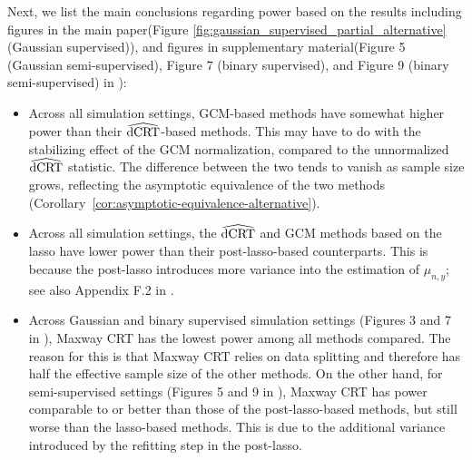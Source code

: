 \documentclass[aos]{imsart}
\theoremstyle{plain}
\theoremstyle{remark}
\newcommand{\dCRThat}{\widehat{\textnormal{dCRT}}}		%
\begin{document}
Next, we list the main conclusions regarding power based on the results including figures in the main paper(Figure \ref{fig:gaussian_supervised_partial_alternative} (Gaussian supervised)), and figures in supplementary material(Figure 5 (Gaussian semi-supervised), Figure 7 (binary supervised), and Figure 9 (binary semi-supervised) in \cite{supplementary}): 
\begin{itemize}
    \item Across all simulation settings, GCM-based methods have somewhat higher power than their $\dCRThat$-based methods. This may have to do with the stabilizing effect of the GCM normalization, compared to the unnormalized $\dCRThat$ statistic. The difference between the two tends to vanish as sample size grows, reflecting the asymptotic equivalence of the two methods (Corollary~\ref{cor:asymptotic-equivalence-alternative}).
    \item Across all simulation settings, the $\dCRThat$ and GCM methods based on the lasso have lower power than their post-lasso-based counterparts. This is because the post-lasso introduces more variance into the estimation of $\mu_{n,y}$; see also Appendix F.2 in \cite{supplementary}.
    \item Across Gaussian and binary supervised simulation settings (Figures 3 and 7 in \cite{supplementary}), Maxway CRT has the lowest power among all methods compared. The reason for this is that Maxway CRT relies on data splitting and therefore has half the effective sample size of the other methods. On the other hand, for semi-supervised settings (Figures 5 and 9 in \cite{supplementary}), Maxway CRT has power comparable to or better than those of the post-lasso-based methods, but still worse than the lasso-based methods. This is due to the additional variance introduced by the refitting step in the post-lasso.
\end{itemize}
\end{document}

